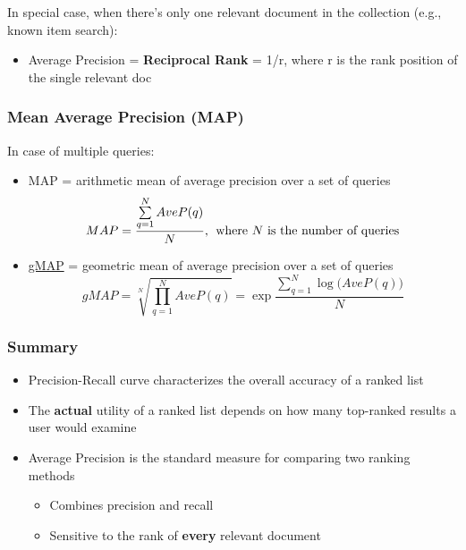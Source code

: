 In special case, when there’s only one relevant document in the collection (e.g., known item search): 
\begin{itemize}
\item Average Precision = \textbf{Reciprocal Rank} = 1/r, where r is the rank position of the single relevant doc
\end{itemize}

\subsubsection{Mean Average Precision (MAP)}
In case of multiple queries:
\begin{itemize}
\item MAP = arithmetic mean of average precision over a set of queries 
\begin{equation*}
MAP = \frac{\sum\limits_{q=1}^{N}AveP(q)}{N}\text{,\; where $N$ is the number of queries}
\end{equation*}

\item \href{http://trec.nist.gov/pubs/trec15/appendices/CE.MEASURES06.pdf}{gMAP} = geometric mean of average precision over a set of queries
\begin{equation*}
gMAP = \sqrt[N]{\prod_{q=1}^{N}AveP(q)} = \exp \frac{\sum\limits_{q=1}^{N} \log \big(AveP(q)\big)}{N}
\end{equation*}
\end{itemize}

\subsubsection{Summary}
\begin{itemize}
\item Precision-Recall curve characterizes the overall accuracy of a ranked list
\item The \textbf{actual} utility of a ranked list depends on how many top-ranked results a user would examine
\item Average Precision is the standard measure for comparing two ranking methods
\begin{itemize}
\item Combines precision and recall
\item Sensitive to the rank of \textbf{every} relevant document
\end{itemize}
\end{itemize}

